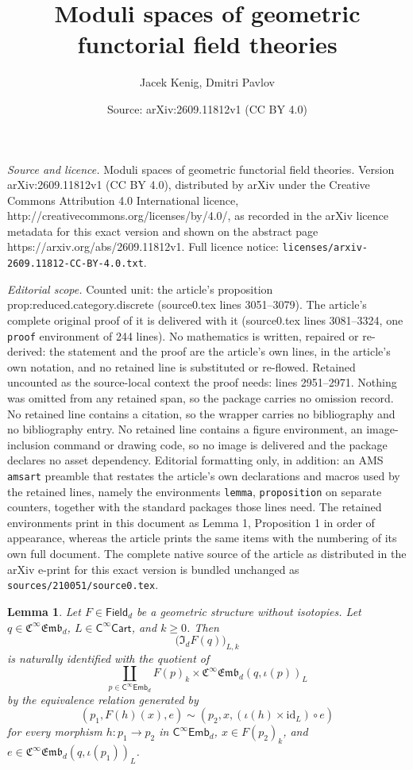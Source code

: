 \documentclass[10pt,a4paper]{amsart}
\title{Moduli spaces of geometric functorial field theories}
\author{Jacek Kenig, Dmitri Pavlov}
\date{Source: arXiv:2609.11812v1 (CC BY 4.0)}
\newtheorem{lemma}{Lemma}
\newcommand{\Cart}{\cat{C}^{\infty}\cat{Cart}}
\newcommand{\cat}[1]{\mathsf{#1}}
\newcommand{\femb}[1]{\mathfrak{C}^{\infty}\mathfrak{Emb}_{#1}}
\newcommand{\fembnoniso}[1]{\cat{C}^{\infty}\cat{Emb}_{#1}}
\newcommand{\fieldnoniso}[1]{\cat{Field}_{#1}}
\newcommand{\id}{\mathrm{id}}
\begin{document}
\maketitle

\noindent\emph{Source and licence.} Moduli spaces of geometric functorial field theories. Version arXiv:2609.11812v1 (CC BY 4.0), distributed by arXiv under the Creative Commons Attribution 4.0 International licence, http://creativecommons.org/licenses/by/4.0/, as recorded in the arXiv licence metadata for this exact version and shown on the abstract page https://arxiv.org/abs/2609.11812v1. Full licence notice: \texttt{licenses/arxiv-2609.11812-CC-BY-4.0.txt}.\par\smallskip

\noindent\textit{Editorial scope.} Counted unit: the article's proposition prop:reduced.category.discrete (source0.tex lines 3051--3079). The article's complete original proof of it is delivered with it (source0.tex lines 3081--3324, one \texttt{proof} environment of 244 lines). No mathematics is written, repaired or re-derived: the statement and the proof are the article's own lines, in the article's own notation, and no retained line is substituted or re-flowed.  Retained uncounted as the source-local context the proof needs: lines 2951--2971.  Nothing was omitted from any retained span, so the package carries no omission record.  No retained line contains a citation, so the wrapper carries no bibliography and no bibliography entry.  No retained line contains a figure environment, an image-inclusion command or drawing code, so no image is delivered and the package declares no asset dependency.  Editorial formatting only, in addition: an AMS \texttt{amsart} preamble that restates the article's own declarations and macros used by the retained lines, namely the environments \texttt{lemma}, \texttt{proposition} on separate counters, together with the standard packages those lines need.  The retained environments print in this document as Lemma 1, Proposition 1 in order of appearance, whereas the article prints the same items with the numbering of its own full document.  The complete native source of the article as distributed in the arXiv e-print for this exact version is bundled unchanged as \texttt{sources/210051/source0.tex}.
\begin{lemma}\label{lem:LKE.raw.triples}
  Let \(F\in \fieldnoniso{d}\) be a geometric structure without isotopies.
  Let \(q\in \femb{d}\), \(L\in \Cart\), and \(k\geq 0\). Then
  \[
    \bigl(\mathfrak{I}_{d}F(q)\bigr)_{L,k}
  \]
  is naturally identified with the quotient of
  \[
    \coprod_{p\in \fembnoniso{d}}
    F(p)_k\times \femb{d}(q,\iota(p))_L
  \]
  by the equivalence relation generated by
  \[
    (p_1,F(h)(x),e)
    \sim
    (p_2,x,(\iota(h)\times \id_L)\circ e)
  \]
  for every morphism \(h:p_1\to p_2\) in \(\fembnoniso{d}\),
  \(x\in F(p_2)_k\), and
  \(e\in \femb{d}(q,\iota(p_1))_L\).
\end{lemma}
\end{document}
